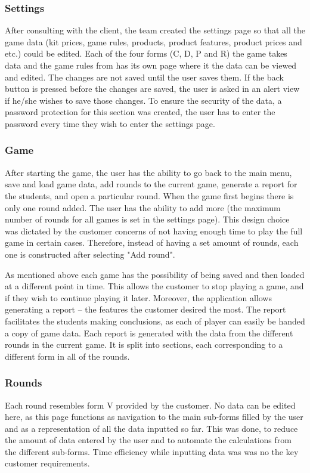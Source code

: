 \documentclass{l3proj}
\begin{document}
\subsubsection{Settings}
After consulting with the client, the team created the settings page so that all the game data (kit prices, game rules, products, product features, product prices and etc.) could be edited. Each of the four forms (C, D, P and R) the game takes data and the game rules from has its own page where it the data can be viewed and edited. The changes are not saved until the user saves them. If the back button is pressed before the changes are saved, the user is asked in an alert view if he/she wishes to save those changes. To ensure the security of the data, a password protection for this section was created, the user has to enter the password every time they wish to enter the settings page.


\subsubsection{Game}
After starting the game, the user has the ability to go back to the main menu, save and load game data, add rounds to the current game, generate a report for the students, and open a particular round. When the game first begins there is only one round added. The user has the ability to add more (the maximum number of rounds for all games is set in the settings page). This design choice was dictated by the customer concerns of not having enough time to play the full game in certain cases. Therefore, instead of having a set amount of rounds, each one is constructed after selecting "Add round".

As mentioned above each game has the possibility of being saved and then loaded at a different point in time. This allows the customer to stop playing a game, and if they wish to continue playing it later. Moreover, the application allows generating a report -- the features the customer desired the most. The report facilitates the students making conclusions, as each of player can easily be handed a copy of game data. Each report is generated with the data from the different rounds in the current game. It is split into sections, each corresponding to a different form in all of the rounds.


\subsubsection{Rounds}
Each round resembles form V provided by the customer. No data can be edited here, as this page functions as navigation to the main sub-forms filled by the user and as a representation of all the data inputted so far. This was done, to reduce the amount of data entered by the user and to automate the calculations from the different sub-forms. Time efficiency while inputting data was was no the key customer requirements.
\end{document}
